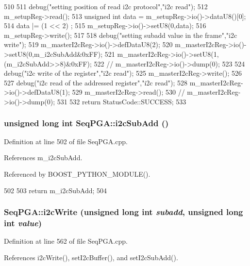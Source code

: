 \begin{DoxyCode}
510                            {
511   debug("setting position of read i2c protocol","i2c read");
512   m_setupReg->read();
513   unsigned int data = m_setupReg->io()->dataU8()[0];
514   data |= (1 << 2)  ;     
515   m_setupReg->io()->setU8(0,data);
516   m_setupReg->write();
517     
518   debug("setting subadd value in the frame","i2c write");
519   m_masterI2cReg->io()->defDataU8(2);
520   m_masterI2cReg->io()->setU8(0,m_i2cSubAdd&0xFF);
521   m_masterI2cReg->io()->setU8(1,(m_i2cSubAdd>>8)&0xFF);
522   //  m_masterI2cReg->io()->dump(0);
523 
524   debug("i2c write of the register","i2c read");
525   m_masterI2cReg->write();
526 
527   debug("i2c read of the addressed register","i2c read");
528   m_masterI2cReg->io()->defDataU8(1);
529   m_masterI2cReg->read();
530   //  m_masterI2cReg->io()->dump(0);
531 
532   return StatusCode::SUCCESS;
533 }
\end{DoxyCode}
\hypertarget{classSeqPGA_a6c7137f9b45a20ecfcccf1d47e5af985}{
\subsubsection[{i2cSubAdd}]{\setlength{\rightskip}{0pt plus 5cm}unsigned long int SeqPGA::i2cSubAdd ()}}
\label{classSeqPGA_a6c7137f9b45a20ecfcccf1d47e5af985}


Definition at line 502 of file SeqPGA.cpp.

References m\_\-i2cSubAdd.

Referenced by BOOST\_\-PYTHON\_\-MODULE().


\begin{DoxyCode}
502                                    {
503   return m_i2cSubAdd; 
504 }
\end{DoxyCode}
\hypertarget{classSeqPGA_a4176b2047888421f8766d038e35bccfd}{
\subsubsection[{i2cWrite}]{ SeqPGA::i2cWrite (unsigned long int {\em subadd}, \/  unsigned long int {\em value})}}
\label{classSeqPGA_a4176b2047888421f8766d038e35bccfd}


Definition at line 562 of file SeqPGA.cpp.

References i2cWrite(), setI2cBuffer(), and setI2cSubAdd().


